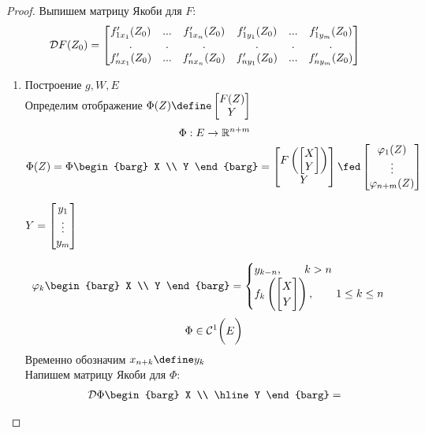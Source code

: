 \begin{proof}
	Выпишем матрицу Якоби для $ F $:
	$$ \mc{D}F(Z_0) =
	\begin{bmatrix}
		f_{1x_1}'(Z_0) & ... & f_{1x_n}'(Z_0) & f_{1y_1}'(Z_0) & ... & f_{1y_m}'(Z_0) \\
		. & . & . & . & . & . \\
		f_{nx_1}'(Z_0) & ... & f_{nx_n}'(Z_0) & f_{ny_1}'(Z_0) & ... & f_{ny_m}'(Z_0)
	\end{bmatrix} $$
	\begin{enumerate}
		\item Построение $ g, W, E $ \\
		Определим отображение $ \Phi(Z) \define
		\begin{bmatrix}
			F(Z) \\
			Y
		\end{bmatrix} $
		$$ \Phi : E \to \R^{n + m} $$
		$$ \Phi(Z) = \Phi
		\begin{barg}
			X \\
			Y
		\end{barg} =
		\begin{bmatrix}
			F \left(
			\begin{bmatrix}
				X \\
				Y
			\end{bmatrix} \right) \\
			Y
		\end{bmatrix} \fed \column{\vphi_1(Z)}{\vphi_{n + m}(Z)} $$
		\begin{remind}
			$ Y = \column{y_1}{y_m} $
		\end{remind}
		$$ \vphi_k
		\begin{barg}
			X \\
			Y
		\end{barg} =
		\begin{cases}
			y_{k - n}, \qquad k > n \\
			f_k \left(
		\begin{bmatrix}
			X \\
			Y
		\end{bmatrix} \right), \qquad 1 \le k \le n
		\end{cases} $$
		$$ \Phi \in \Cont[1]{E} $$
		Временно обозначим $ x_{n + k} \define y_k $ \\
		Напишем матрицу Якоби для $ \Phi $:
		\begin{multline*}
			\mc{D}\Phi
			\begin{barg}
				X \\
				\hline
				Y
			\end{barg} =

\end{multline*}
\end{enumerate}
\end{proof}
